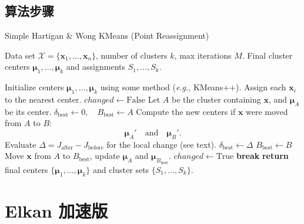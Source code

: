 \documentclass[12pt]{article}  %
\begin{document}
\subsection{算法步骤}
\begin{algorithm}[H]
  \caption{Simple Hartigan \& Wong KMeans (Point Reassignment)}
  \begin{algorithmic}[1]
  \Require Data set $\mathcal{X} = \{\mathbf{x}_1, \ldots, \mathbf{x}_n\}$, number of clusters $k$, max iterations $M$.
  \Ensure Final cluster centers $\boldsymbol{\mu}_1,\ldots,\boldsymbol{\mu}_k$ and assignments $S_1,\ldots,S_k$.
  
  \vspace{6pt}
  \State Initialize centers $\boldsymbol{\mu}_1,\ldots,\boldsymbol{\mu}_k$ using some method (\textit{e.g.}, KMeans++).
  \State Assign each $\mathbf{x}_i$ to the nearest center.
      \State $\mathit{changed} \gets \text{False}$
          \State Let $A$ be the cluster containing $\mathbf{x}$, and $\boldsymbol{\mu}_A$ be its center.
          \State $\delta_{\text{best}} \gets 0,\quad B_{\text{best}} \gets A$
              \State Compute the new centers if $\mathbf{x}$ were moved from $A$ to $B$:
              \[
                \boldsymbol{\mu}_A' \quad \text{and} \quad \boldsymbol{\mu}_B'.
              \]
              \State Evaluate $\Delta = J_{\text{after}} - J_{\text{before}}$ for the local change (see text).
                  \State $\delta_{\text{best}} \gets \Delta$
                  \State $B_{\text{best}} \gets B$
              \EndIf
          \EndFor
              \State Move $\mathbf{x}$ from $A$ to $B_{\text{best}}$, update $\boldsymbol{\mu}_A$ and $\boldsymbol{\mu}_{B_{\text{best}}}$.
              \State $\mathit{changed} \gets \text{True}$
          \EndIf
      \EndFor
          \State \textbf{break}
      \EndIf
  \EndFor
  \State \textbf{return} final centers $\{\boldsymbol{\mu}_1,\ldots,\boldsymbol{\mu}_k\}$ and cluster sets $\{S_1,\ldots,S_k\}$.
  \end{algorithmic}
  \end{algorithm}

\section{Elkan 加速版}
\end{document}
